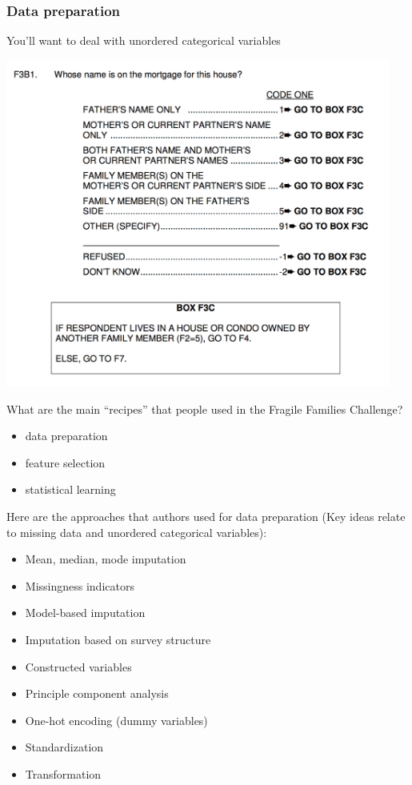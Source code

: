 \documentclass{beamer}
\begin{document}
\begin{frame}
\frametitle{Data preparation}

You'll want to deal with unordered categorical variables

\begin{center}
\includegraphics[width=0.95\textwidth]{figures/f5f3b1}
\end{center}

\end{frame}
\begin{frame}

What are the main ``recipes'' that people used in the Fragile Families Challenge?
\begin{itemize}
\item data preparation
\item feature selection
\item statistical learning
\end{itemize}

\end{frame}
\begin{frame}

Here are the approaches that authors used for data preparation (Key ideas relate to missing data and unordered categorical variables):

\begin{itemize}
\item Mean, median, mode imputation 
\item Missingness indicators
\item Model-based imputation
\item Imputation based on survey structure
\item Constructed variables 
\item Principle component analysis
\item One-hot encoding (dummy variables) 
\item Standardization
\item Transformation
\end{itemize}

\end{frame}
\end{document}
